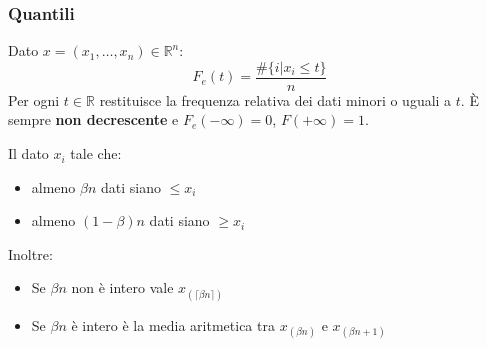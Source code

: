 \subsubsection{Quantili}
\begin{definition}
	Dato $x = (x_1, \ldots, x_n) \in \mathbb{R}^n$:
	\begin{equation}
		F_e(t) = \frac{\#\{i \vert x_i \leq t\}}{n}
	\end{equation}
	Per ogni $t \in \mathbb{R}$ restituisce la frequenza relativa dei dati minori o uguali a $t$. È sempre \textbf{non decrescente} e $F_e(-\infty)=0$, $F(+\infty)=1$.
\end{definition}
\begin{definition}
	Il dato $x_i$ tale che:
	\begin{itemize}
		\item almeno $\beta n$ dati siano $\leq x_i$
		\item almeno $(1- \beta)n$ dati siano $\geq x_i$
	\end{itemize}
	Inoltre:
	\begin{itemize}
		\item Se $\beta n$ non è intero vale $x_{(\lceil\beta n \rceil)}$
		\item Se $\beta n$ è intero è la media aritmetica tra $x_{(\beta n)}$ e $x_{(\beta n +1)}$
	\end{itemize}
\end{definition}

